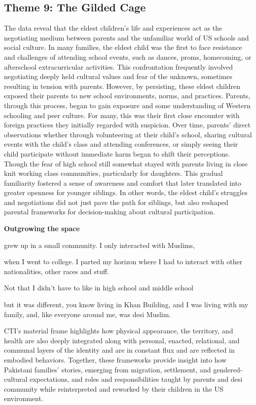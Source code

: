 \subsection{Theme 9: The Gilded Cage}

The data reveal that the eldest children’s life and experiences act as the negotiating medium between parents and the unfamiliar world of US schools and social culture. In many families, the eldest child was the first to face resistance and challenges of attending school events, such as dances, proms, homecoming, or afterschool extracurricular activities. This confrontation frequently involved negotiating deeply held cultural values and fear of the unknown, sometimes resulting in tension with parents. However, by persisting, these eldest children exposed their parents to new school environments, norms, and practices. Parents, through this process, began to gain exposure and some understanding of Western schooling and peer culture. For many, this was their first close encounter with foreign practices they initially regarded with suspicion. Over time, parents’ direct observations whether through volunteering at their child’s school, sharing cultural events with the child’s class and attending conferences, or simply seeing their child participate without immediate harm began to shift their perceptions. Though the fear of high school still somewhat stayed with parents living in close knit working class communities, particularly for daughters. This gradual familiarity fostered a sense of awareness and comfort that later translated into greater openness for younger siblings. In other words, the eldest child’s struggles and negotiations did not just pave the path for siblings, but also reshaped parental frameworks for decision-making about cultural participation.

\textbf{Outgrowing the space}

\begin{FoundPoem}
grew up in a small community. I only interacted with Muslims, 

when I went to college. I parted my horizon where I had to interact with other nationalities, other races and stuff. 

Not that I didn't have to like in high school and middle school

but  it was different, you know living in Khan Building, and I was living with
my family, and, like everyone around me, was desi Muslim.
\end{FoundPoem}

CTI’s material frame highlights how physical appearance, the territory, and health are also deeply integrated along with personal, enacted, relational, and communal layers of the identity and are in constant flux and are reflected in embodied behaviors. Together, these frameworks provide insight into how Pakistani families’ stories, emerging from migration, settlement, and gendered-cultural expectations, and roles and responsibilities taught by parents and desi community while reinterpreted and reworked by their children in the US environment.

